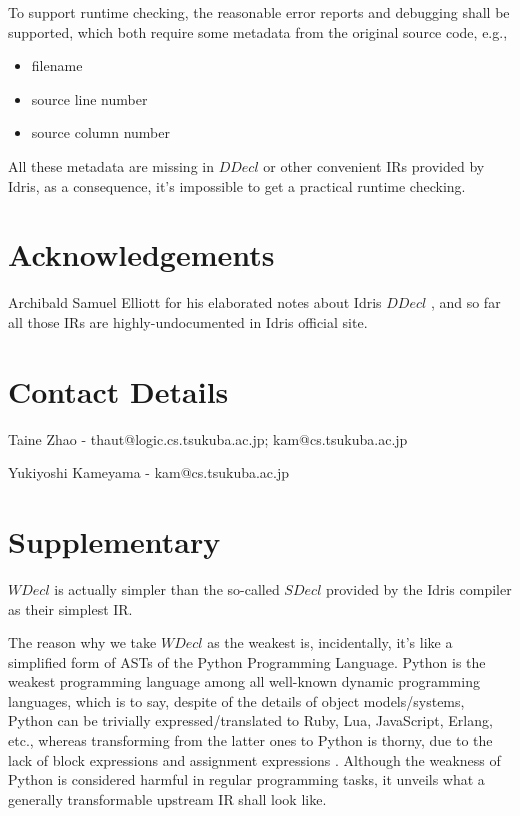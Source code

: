 \documentclass[a1,portrait]{a1poster}
\begin{document}
\begin{multicols}{2}
To support runtime checking, the reasonable error reports and debugging shall be supported,
which both require some metadata from the original source code, e.g.,

\begin{itemize}
    \setlength\itemsep{-0.2em}
    \item filename
    \item source line number
    \item source column number
\end{itemize}

All these metadata are missing in $DDecl$ or other convenient IRs provided by Idris,
as a consequence, it's impossible to get a practical runtime checking.


\begin{small}%
\begin{multicols}{2}%
\nocite{*} %
\end{multicols}
\end{small}

\section*{Acknowledgements}

Archibald Samuel Elliott for his elaborated notes about Idris $DDecl$ \cite {elliott2015concurrency}, and so far all those IRs are highly-undocumented in Idris official site.

\section*{Contact Details}

Taine Zhao - thaut@logic.cs.tsukuba.ac.jp; kam@cs.tsukuba.ac.jp

Yukiyoshi Kameyama - kam@cs.tsukuba.ac.jp

\section*{Supplementary}

$WDecl$ is actually simpler than the so-called $SDecl$ provided by the Idris compiler \cite {brady2013idris} as their simplest IR.

The reason why we take $WDecl$ as the weakest is, incidentally, it's like a simplified form
of ASTs of the Python Programming Language.
Python is the weakest programming language among all well-known dynamic programming languages,
which is to say, despite of the details of object models/systems, Python can be trivially
expressed/translated to Ruby, Lua, JavaScript, Erlang, etc., whereas transforming
from the latter ones to Python is thorny, due to the lack of block expressions and
assignment expressions \cite {pep572}. Although the weakness of Python is considered harmful in regular
programming tasks, it unveils what a generally transformable upstream IR shall look like.

\end{multicols}
\end{document}
